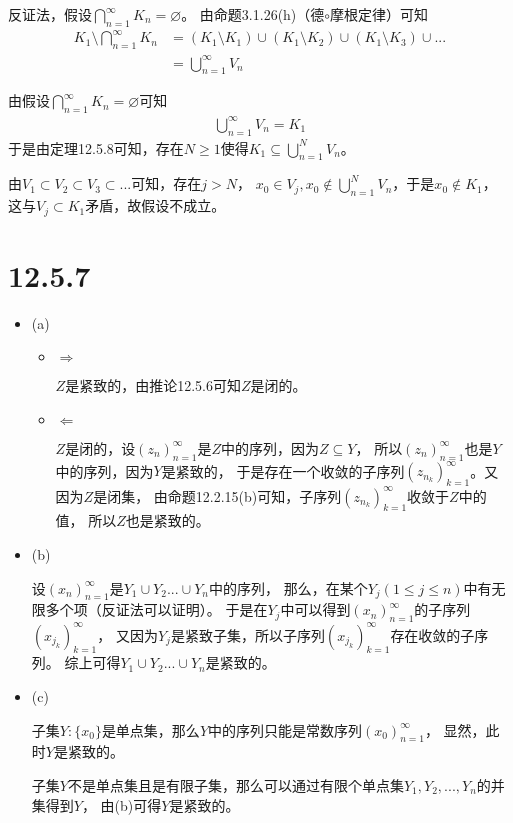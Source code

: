 \documentclass{article}
\begin{document}
反证法，假设$\bigcap\limits_{n = 1}^{\infty} K_n = \varnothing$。
由命题3.1.26(h)（德$\circ$摩根定律）可知
\begin{align*}
  K_1 \setminus \bigcap\limits_{n = 1}^{\infty} K_n & = (K_1 \setminus K_1) \cup (K_1 \setminus K_2) \cup (K_1 \setminus K_3) \cup ... \\
                                                    & = \bigcup \limits_{n = 1}^{\infty} V_n
\end{align*}

由假设$\bigcap\limits_{n = 1}^{\infty} K_n = \varnothing$可知
\begin{align*}
  \bigcup \limits_{n = 1}^{\infty} V_n = K_1
\end{align*}
于是由定理12.5.8可知，存在$N \geq 1$使得$K_1 \subseteq \bigcup \limits_{n = 1}^{N} V_n$。

由$V_1 \subset V_2 \subset V_3 \subset ...$可知，存在$j > N$，
$x_0 \in V_j, x_0 \notin \bigcup \limits_{n = 1}^{N} V_n$，于是$x_0 \notin K_1$，
这与$V_j \subset K_1$矛盾，故假设不成立。

\section*{12.5.7}

\begin{itemize}
  \item (a)

        \begin{itemize}
          \item $\Rightarrow$

                $Z$是紧致的，由推论12.5.6可知$Z$是闭的。
          \item $\Leftarrow$

                $Z$是闭的，设$(z_n)_{n = 1}^\infty$是$Z$中的序列，因为$Z \subseteq Y$，
                所以$(z_n)_{n = 1}^\infty$也是$Y$中的序列，因为$Y$是紧致的，
                于是存在一个收敛的子序列$(z_{n_k})_{k = 1}^\infty$。又因为$Z$是闭集，
                由命题12.2.15(b)可知，子序列$(z_{n_k})_{k = 1}^\infty$收敛于$Z$中的值，
                所以$Z$也是紧致的。
        \end{itemize}
  \item (b)

        设$(x_n)_{n = 1}^\infty$是$Y_1 \cup Y_2 ... \cup Y_n$中的序列，
        那么，在某个$Y_j(1 \leq j \leq n)$中有无限多个项（反证法可以证明）。
        于是在$Y_j$中可以得到$(x_n)_{n = 1}^\infty$的子序列$(x_{j_k})_{k = 1}^\infty$，
        又因为$Y_j$是紧致子集，所以子序列$(x_{j_k})_{k = 1}^\infty$存在收敛的子序列。
        综上可得$Y_1 \cup Y_2 ... \cup Y_n$是紧致的。

  \item (c)

        子集$Y : \{x_0\}$是单点集，那么$Y$中的序列只能是常数序列$(x_0)_{n = 1}^\infty$，
        显然，此时$Y$是紧致的。

        子集$Y$不是单点集且是有限子集，那么可以通过有限个单点集$Y_1, Y_2, ..., Y_n$的并集得到$Y$，
        由(b)可得$Y$是紧致的。

\end{itemize}
\end{document}
